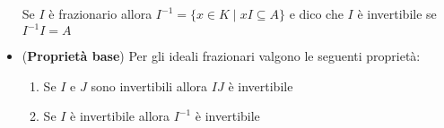 \documentclass[a4paper,NoNotes,GeneralMath]{stdmdoc}
\begin{document}
\begin{itemize}
  Se $I$ è frazionario allora
  $I^{-1} = \{ x \in K \mid xI \subseteq A \}$ e dico che $I$ è
  invertibile se $I^{-1} I = A$
\item ({\bf Proprietà base}) Per gli ideali frazionari valgono le
  seguenti proprietà:
  \begin{enumerate}
  \item Se $I$ e $J$ sono invertibili allora $IJ$ è invertibile
  \item Se $I$ è invertibile allora $I^{-1}$ è invertibile
  \end{enumerate}
\end{itemize}
\end{document}

